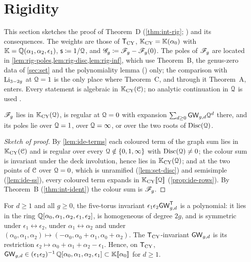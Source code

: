 \section{Rigidity}
\label{sec:rig}

This section sketches the proof of Theorem~D (\cref{thm:int-rig}; ) and its consequences. The weights are those of $\mathsf{T}_{\mathrm{CY}}$, $\mathbb{K}_{\mathrm{CY}}=\mathbb{K}(\alpha_0)$ with $\mathbb{K}=\mathbb{Q}(\alpha_1,\alpha_2,\epsilon_1)$, $\mathsf{s}\coloneqq1/\mathcal{Q}$, and $\mathscr{G}_g\coloneqq\mathscr{F}_g-\mathscr{F}_g(0)$. The poles of $\mathscr{F}_g$ are located in \cref{lem:rig-poles,lem:rig-disc,lem:rig-inf}, which use Theorem~B, the genus-zero data of \cref{sec:set} and the polynomiality lemma (\cite{GP99}) only; the comparison with $\operatorname{Li}_{3-2g}$ at $\mathcal{Q}=1$ is the only place where Theorem~C, and through it Theorem~A, enters. Every statement is algebraic in $\mathbb{K}_{\mathrm{CY}}(\mathcal{C})$; no analytic continuation in $\mathcal{Q}$ is used .

\begin{lem}
\label{lem:rig-poles}
$\mathscr{F}_g$ lies in $\mathbb{K}_{\mathrm{CY}}(\mathcal{Q})$, is regular at $\mathcal{Q}=0$ with expansion $\sum_{d\geq 0}\mathsf{GW}_{g,d}\mathcal{Q}^d$ there, and its poles lie over $\mathcal{Q}=1$, over $\mathcal{Q}=\infty$, or over the two roots of $\operatorname{Disc}(\mathcal{Q})$.
\end{lem}

\begin{proof}[Sketch of proof]
By \cref{lem:ide-terms} each coloured term of the graph sum lies in $\mathbb{K}_{\mathrm{CY}}(\mathcal{C})$ and is regular over every $\mathcal{Q}\notin\{0,1,\infty\}$ with $\operatorname{Disc}(\mathcal{Q})\neq0$; the colour sum is invariant under the deck involution, hence lies in $\mathbb{K}_{\mathrm{CY}}(\mathcal{Q})$; and at the two points of $\mathcal{C}$ over $\mathcal{Q}=0$, which is unramified (\cref{lem:set-disc}) and semisimple (\cref{lem:ide-ss}), every coloured term expands in $\mathbb{K}_{\mathrm{CY}}[\![ \mathcal{Q} ]\!]$ (\cref{prop:ide-rows}). By Theorem~B (\cref{thm:int-ident}) the colour sum is $\mathscr{F}_g$.
\end{proof}

\begin{lem}
\label{lem:rig-poly}
For $d\geq 1$ and all $g\geq 0$, the five-torus invariant $\epsilon_1\epsilon_2\mathsf{GW}^{\mathsf{T}}_{g,d}$ is a polynomial: it lies in the ring $\mathbb{Q}[\alpha_0,\alpha_1,\alpha_2,\epsilon_1,\epsilon_2]$, is homogeneous of degree $2g$, and is symmetric under $\epsilon_1\leftrightarrow\epsilon_2$, under $\alpha_1\leftrightarrow\alpha_2$ and under $(\alpha_0,\alpha_1,\alpha_2)\mapsto(-\alpha_0,\alpha_0+\alpha_1,\alpha_0+\alpha_2)$. The $\mathsf{T}_{\mathrm{CY}}$-invariant $\mathsf{GW}_{g,d}$ is its restriction $\epsilon_2\mapsto\alpha_0+\alpha_1+\alpha_2-\epsilon_1$. Hence, on $\mathsf{T}_{\mathrm{CY}}$, $\mathsf{GW}_{g,d}\in(\epsilon_1\epsilon_2)^{-1}\,\mathbb{Q}[\alpha_0,\alpha_1,\alpha_2,\epsilon_1]\subset\mathbb{K}[\![ \alpha_0 ]\!]$ for $d\geq 1$.
\end{lem}

